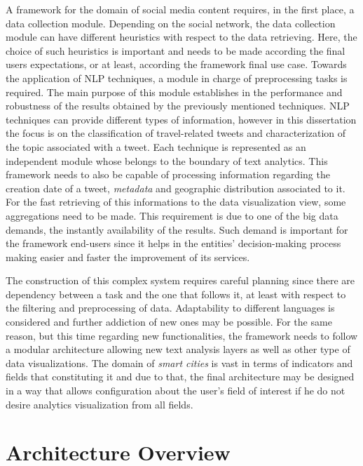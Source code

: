 A framework for the domain of social media content requires, in the first place, a data collection module. Depending on the social network, the data collection module can have different heuristics with respect to the data retrieving. Here, the choice of such heuristics is important and needs to be made according the final users expectations, or at least, according the framework final use case. Towards the application of NLP techniques, a module in charge of preprocessing tasks is required. The main purpose of this module establishes in the performance and robustness of the results obtained by the previously mentioned techniques. NLP techniques can provide different types of information, however in this dissertation the focus is on the classification of travel-related tweets and characterization of the topic associated with a tweet. Each technique is represented as an independent module whose belongs to the boundary of text analytics. This framework needs to also be capable of processing information regarding the creation date of a tweet, \textit{metadata} and geographic distribution associated to it. For the fast retrieving of this informations to the data visualization view, some aggregations need to be made. This requirement is due to one of the big data demands, the instantly availability of the results. Such demand is important for the framework end-users since it helps in the entities' decision-making process making easier and faster the improvement of its services.

The construction of this complex system requires careful planning since there are dependency between a task and the one that follows it, at least with respect to the filtering and preprocessing of data. Adaptability to different languages is considered and further addiction of new ones may be possible. For the same reason, but this time regarding new functionalities, the framework needs to follow a modular architecture allowing new text analysis layers as well as other type of data visualizations. The domain of \textit{smart cities} is vast in terms of indicators and fields that constituting it and due to that, the final architecture may be designed in a way that allows configuration about the user's field of interest if he do not desire analytics visualization from all fields.

\section{Architecture Overview}\label{sec:architecture}


